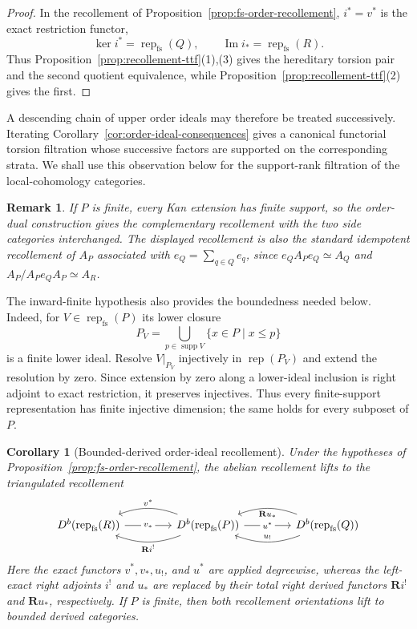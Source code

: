 \documentclass[10pt,a4paper]{amsart}
\newtheorem{corollary}[theorem]{Corollary}
\newtheorem{remark}[theorem]{Remark}
\newcommand{\Rep}{\operatorname{rep}}
\begin{document}
\begin{proof}
In the recollement of Proposition~\ref{prop:fs-order-recollement},
$i^*=v^*$ is the exact restriction functor,
\[
\ker i^*=\Rep_{\mathrm{fs}}(Q),
\qquad
\operatorname{Im}i_*=\Rep_{\mathrm{fs}}(R).
\]
Thus Proposition~\ref{prop:recollement-ttf}(1),(3) gives the hereditary
torsion pair and the second quotient equivalence, while
Proposition~\ref{prop:recollement-ttf}(2) gives the first.
\end{proof}


A descending chain of upper order ideals may therefore be treated
successively.  Iterating Corollary~\ref{cor:order-ideal-consequences} gives a
canonical functorial torsion filtration whose successive factors are supported
on the corresponding strata.  We shall use this observation below for the
support-rank filtration of the local-cohomology categories.

\begin{remark}\label{rem:finite-complementary-recollements}
If $P$ is finite, every Kan extension has finite support, so the order-dual
construction gives the complementary recollement with the two side categories
interchanged.  The displayed recollement is also the standard idempotent
recollement of $A_P$ associated with $e_Q=\sum_{q\in Q}e_q$, since
$e_QA_Pe_Q\simeq A_Q$ and $A_P/A_Pe_QA_P\simeq A_R$.
\end{remark}

The inward-finite hypothesis also provides the boundedness needed below.
Indeed, for $V\in\Rep_{\mathrm{fs}}(P)$ its lower closure
\[
P_V=\bigcup_{p\in\operatorname{supp}V}\{x\in P\mid x\le p\}
\]
is a finite lower ideal.  Resolve $V|_{P_V}$ injectively in $\Rep(P_V)$ and
extend the resolution by zero.  Since extension by zero along a lower-ideal
inclusion is right adjoint to exact restriction, it preserves injectives.
Thus every finite-support representation has finite injective dimension; the
same holds for every subposet of $P$.

\begin{corollary}[Bounded-derived order-ideal recollement]
\label{cor:fs-derived-recollement}
Under the hypotheses of Proposition~\ref{prop:fs-order-recollement}, the
abelian recollement lifts to the triangulated recollement
\[
\begin{tikzcd}[column sep=4.2em]
D^b\!\left(\Rep_{\mathrm{fs}}(R)\right)
  \arrow[r, "v_*" description]
& D^b\!\left(\Rep_{\mathrm{fs}}(P)\right)
  \arrow[l, bend right=20, "v^*"']
  \arrow[l, bend left=20, "\mathbf R i^!"]
  \arrow[r, "u^*" description]
& D^b\!\left(\Rep_{\mathrm{fs}}(Q)\right)
  \arrow[l, bend left=20, "u_!"']
  \arrow[l, bend right=20, "\mathbf R u_*"]
\end{tikzcd}
\]
Here the exact functors $v^*,v_*,u_!$, and $u^*$ are applied degreewise,
whereas the left-exact right adjoints $i^!$ and $u_*$ are replaced by their
total right derived functors $\mathbf R i^!$ and $\mathbf R u_*$,
respectively.  If $P$ is finite, then both recollement orientations lift to
bounded derived categories.
\end{corollary}
\end{document}
